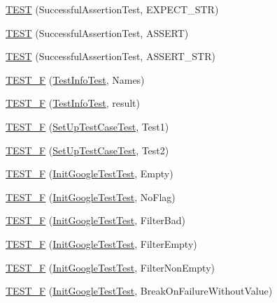 \begin{DoxyCompactItemize}
\hyperlink{namespacetesting_a9b1e4b53f277d25e6d6413a0004481bb}{\-T\-E\-S\-T} (\-Successful\-Assertion\-Test, \-E\-X\-P\-E\-C\-T\-\_\-\-S\-T\-R)
\item 
\hyperlink{namespacetesting_afbe4c8233faff6eba04902b3cb041632}{\-T\-E\-S\-T} (\-Successful\-Assertion\-Test, \-A\-S\-S\-E\-R\-T)
\item 
\hyperlink{namespacetesting_a83dfac108c207258287b9f7aa9171e8a}{\-T\-E\-S\-T} (\-Successful\-Assertion\-Test, \-A\-S\-S\-E\-R\-T\-\_\-\-S\-T\-R)
\item 
\hyperlink{namespacetesting_acd53db89097aba1468724d6446069b1e}{\-T\-E\-S\-T\-\_\-\-F} (\hyperlink{classtesting_1_1TestInfoTest}{\-Test\-Info\-Test}, \-Names)
\item 
\hyperlink{namespacetesting_ab00e29c00b3e29cdfa21d23b79dd3776}{\-T\-E\-S\-T\-\_\-\-F} (\hyperlink{classtesting_1_1TestInfoTest}{\-Test\-Info\-Test}, result)
\item 
\hyperlink{namespacetesting_a01e948eb5427d31f70eafaf472e2bfa8}{\-T\-E\-S\-T\-\_\-\-F} (\hyperlink{classtesting_1_1SetUpTestCaseTest}{\-Set\-Up\-Test\-Case\-Test}, \-Test1)
\item 
\hyperlink{namespacetesting_a8fc2e448ce96e4da357a2129d49e86e3}{\-T\-E\-S\-T\-\_\-\-F} (\hyperlink{classtesting_1_1SetUpTestCaseTest}{\-Set\-Up\-Test\-Case\-Test}, \-Test2)
\item 
\hyperlink{namespacetesting_ae80ccfaa178730f49af649cd044e84e4}{\-T\-E\-S\-T\-\_\-\-F} (\hyperlink{classtesting_1_1InitGoogleTestTest}{\-Init\-Google\-Test\-Test}, \-Empty)
\item 
\hyperlink{namespacetesting_add96563b5ca11c20fe2766a848c2bb63}{\-T\-E\-S\-T\-\_\-\-F} (\hyperlink{classtesting_1_1InitGoogleTestTest}{\-Init\-Google\-Test\-Test}, \-No\-Flag)
\item 
\hyperlink{namespacetesting_ab368a135e5a7a59bceb912a5f636004a}{\-T\-E\-S\-T\-\_\-\-F} (\hyperlink{classtesting_1_1InitGoogleTestTest}{\-Init\-Google\-Test\-Test}, \-Filter\-Bad)
\item 
\hyperlink{namespacetesting_a04d011d2e5695513c45216ae1b98095b}{\-T\-E\-S\-T\-\_\-\-F} (\hyperlink{classtesting_1_1InitGoogleTestTest}{\-Init\-Google\-Test\-Test}, \-Filter\-Empty)
\item 
\hyperlink{namespacetesting_a69dcb047e8cf4f93e8132faf11ba7110}{\-T\-E\-S\-T\-\_\-\-F} (\hyperlink{classtesting_1_1InitGoogleTestTest}{\-Init\-Google\-Test\-Test}, \-Filter\-Non\-Empty)
\item 
\hyperlink{namespacetesting_afc3e46c96f27aa2b502b15e8e4bab2ca}{\-T\-E\-S\-T\-\_\-\-F} (\hyperlink{classtesting_1_1InitGoogleTestTest}{\-Init\-Google\-Test\-Test}, \-Break\-On\-Failure\-Without\-Value)

\end{DoxyCompactItemize}
